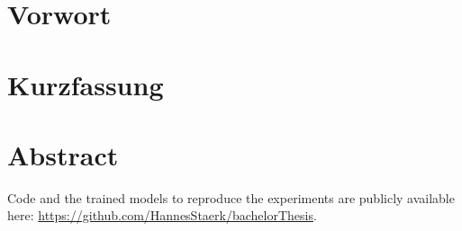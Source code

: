 \section{Vorwort}
\section{Kurzfassung}
\section{Abstract}

Code and the trained models to reproduce the experiments are publicly available here:
\href{https://github.com/HannesStaerk/bachelorThesis}{https://github.com/HannesStaerk/bachelorThesis}.




